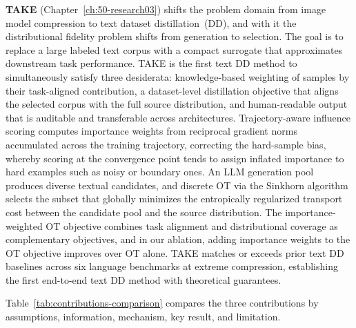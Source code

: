 \begin{foldable}
  \textbf{TAKE} (Chapter~\ref{ch:50-research03}) shifts the problem domain from image model compression to text dataset distillation~(\ac{DD}), and with it the distributional fidelity problem shifts from generation to selection.
  The goal is to replace a large labeled text corpus with a compact surrogate that approximates downstream task performance.
  TAKE is the first text \ac{DD} method to simultaneously satisfy three desiderata: knowledge-based weighting of samples by their task-aligned contribution, a dataset-level distillation objective that aligns the selected corpus with the full source distribution, and human-readable output that is auditable and transferable across architectures.
  Trajectory-aware influence scoring computes importance weights from reciprocal gradient norms accumulated across the training trajectory, correcting the hard-sample bias, whereby scoring at the convergence point tends to assign inflated importance to hard examples such as noisy or boundary ones.
  An \ac{LLM} generation pool produces diverse textual candidates, and discrete \ac{OT} via the Sinkhorn algorithm selects the subset that globally minimizes the entropically regularized transport cost between the candidate pool and the source distribution.
  The importance-weighted \ac{OT} objective combines task alignment and distributional coverage as complementary objectives, and in our ablation, adding importance weights to the \ac{OT} objective improves over \ac{OT} alone.
  TAKE matches or exceeds prior text \ac{DD} baselines across six language benchmarks at extreme compression, establishing the first end-to-end text \ac{DD} method with theoretical guarantees.
\end{foldable}

\begin{foldable}
  Table~\ref{tab:contributions-comparison} compares the three contributions by assumptions, information, mechanism, key result, and limitation.
\end{foldable}

